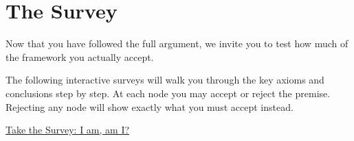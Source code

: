 \documentclass[11pt]{book}
\begin{document}



\frontmatter

\tableofcontents

\mainmatter
















\section*{The Survey}

Now that you have followed the full argument, we invite you to test how much of the framework you actually accept.

The following interactive surveys will walk you through the key axioms and conclusions step by step.
At each node you may accept or reject the premise. Rejecting any node will show exactly what you must accept instead.

\href{https://meskanen.com/surveys/surveys.html}{Take the Survey: I am, am I?} 


\backmatter
\printbibliography
\printglossary
\end{document}

